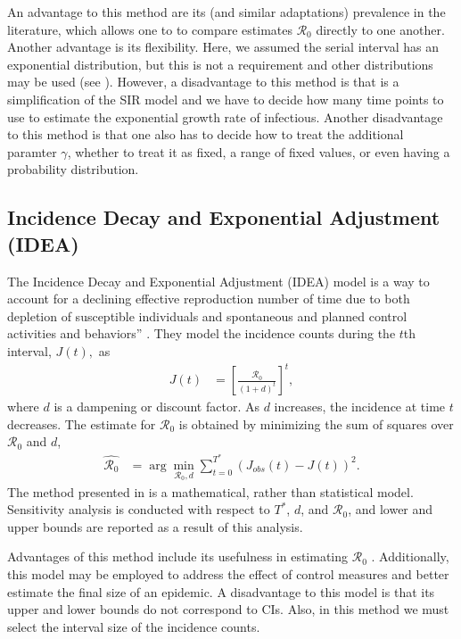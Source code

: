 \documentclass[12pt]{article}
\newcommand{\rr}{\ensuremath{\mathcal{R}_0}}
\begin{document}
An advantage to this method are its (and similar adaptations) prevalence in the literature, which allows one to to compare estimates $\rr$ directly to one another.  Another advantage is its flexibility.  Here, we assumed the serial interval has an exponential distribution, but this is not a requirement and other distributions may be used (see \cite{wallinga2007generation}).  However, a disadvantage to this method is that is a simplification of the SIR model and we have to decide how many time points to use to estimate the exponential growth rate of infectious.  Another disadvantage to this method is that one also has to decide how to treat the additional paramter $\gamma$, whether to treat it as fixed, a range of fixed values, or even having a probability distribution.


\subsection{Incidence Decay and Exponential Adjustment (IDEA)}\label{sec:idea}
The Incidence Decay and Exponential Adjustment (IDEA) model is a way to account for a declining effective reproduction number of time due to both depletion of susceptible individuals and spontaneous and planned control activities and behaviors'' \citep{fisman2013}.  They model the incidence counts during the $t$th interval, $J(t),$ as
\begin{align*}
  J(t) &= \left [ \frac{\rr}{(1 + d)^t}\right ]^t,
\end{align*}
where $d$ is a dampening or discount factor.  As $d$ increases, the incidence at time $t$  decreases. The estimate for $\rr$ is obtained by minimizing the sum of squares over $\rr$ and $d$,
\begin{align*}
  \hat{\rr} &=  \arg \min_{\rr,d} \sum_{t=0}^{T^*}\left (J_{obs}(t) - J(t) \right)^2.
\end{align*}
The method presented in \cite{fisman2013} is a mathematical, rather than statistical model.  Sensitivity analysis is conducted with respect to $T^*$, $d$, and $\rr$, and lower and upper bounds are reported as a result of this analysis.

Advantages of this method include its usefulness in estimating $\rr$ \citep{fisman2014,majumder2016}.  Additionally, this model may be employed to address the effect of control measures and better estimate the final size of an epidemic.  A disadvantage to this model is that its upper and lower bounds do not correspond to CIs.  Also, in this method we must select the interval size of the incidence counts.
\end{document}
